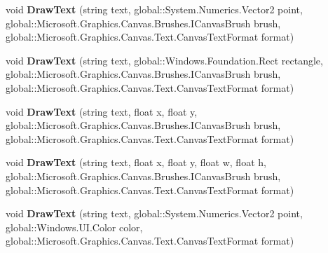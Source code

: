 \begin{DoxyCompactItemize}
void {\bfseries Draw\+Text} (string text, global\+::\+System.\+Numerics.\+Vector2 point, global\+::\+Microsoft.\+Graphics.\+Canvas.\+Brushes.\+I\+Canvas\+Brush brush, global\+::\+Microsoft.\+Graphics.\+Canvas.\+Text.\+Canvas\+Text\+Format format)
\item 
\mbox{\label{interface_microsoft_1_1_graphics_1_1_canvas_1_1_i_canvas_drawing_session_a3161a63423adf013a40c6d04be34dbd2}} 
void {\bfseries Draw\+Text} (string text, global\+::\+Windows.\+Foundation.\+Rect rectangle, global\+::\+Microsoft.\+Graphics.\+Canvas.\+Brushes.\+I\+Canvas\+Brush brush, global\+::\+Microsoft.\+Graphics.\+Canvas.\+Text.\+Canvas\+Text\+Format format)
\item 
\mbox{\label{interface_microsoft_1_1_graphics_1_1_canvas_1_1_i_canvas_drawing_session_af3067e2e1221c4fac0210f755a04504e}} 
void {\bfseries Draw\+Text} (string text, float x, float y, global\+::\+Microsoft.\+Graphics.\+Canvas.\+Brushes.\+I\+Canvas\+Brush brush, global\+::\+Microsoft.\+Graphics.\+Canvas.\+Text.\+Canvas\+Text\+Format format)
\item 
\mbox{\label{interface_microsoft_1_1_graphics_1_1_canvas_1_1_i_canvas_drawing_session_a176cf93d455896bcfa25da3ed7b41a7b}} 
void {\bfseries Draw\+Text} (string text, float x, float y, float w, float h, global\+::\+Microsoft.\+Graphics.\+Canvas.\+Brushes.\+I\+Canvas\+Brush brush, global\+::\+Microsoft.\+Graphics.\+Canvas.\+Text.\+Canvas\+Text\+Format format)
\item 
\mbox{\label{interface_microsoft_1_1_graphics_1_1_canvas_1_1_i_canvas_drawing_session_a1fbae46edd2353fb50ee237788530985}} 
void {\bfseries Draw\+Text} (string text, global\+::\+System.\+Numerics.\+Vector2 point, global\+::\+Windows.\+U\+I.\+Color color, global\+::\+Microsoft.\+Graphics.\+Canvas.\+Text.\+Canvas\+Text\+Format format)
\item 
\mbox{\label{interface_microsoft_1_1_graphics_1_1_canvas_1_1_i_canvas_drawing_session_a1cf634350eda5e0895814a05a3e6ab4f}} 

\end{DoxyCompactItemize}
